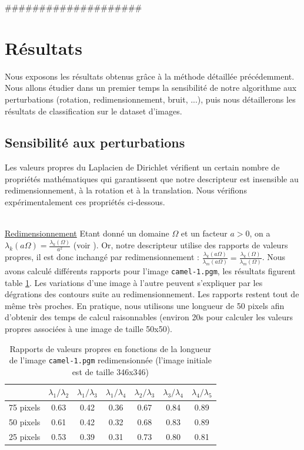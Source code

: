 \documentclass[a4paper,10pt]{article} %
\theoremstyle{definition} %
\begin{document}
####################%

\section{Résultats}

Nous exposons les résultats obtenus grâce à la méthode détaillée précédemment. Nous allons étudier dans un premier temps la sensibilité de notre algorithme aux perturbations (rotation, redimensionnement, bruit, ...), puis nous détaillerons les résultats de classification sur le dataset d'images.


  \subsection{Sensibilité aux perturbations}

Les valeurs propres du Laplacien de Dirichlet vérifient un certain nombre de propriétés mathématiques qui garantissent que notre descripteur est insensible au redimensionnement, à la rotation et à la translation. Nous vérifions expérimentalement ces propriétés ci-dessous.

~\\
\underline{Redimensionnement} Etant donné un domaine $\Omega$ et un facteur $a > 0$, on a $\lambda_k(a \Omega) = \frac{\lambda_k(\Omega)}{a^2}$ (voir \cite{KhabouHR07}). Or, notre descripteur utilise des rapports de valeurs propres, il est donc inchangé par redimensionnement : $\frac{\lambda_k(a \Omega)}{\lambda_m(a \Omega)} = \frac{\lambda_k(\Omega)}{\lambda_m(\Omega)}$. Nous avons calculé différents rapports pour l'image \texttt{camel-1.pgm}, les résultats figurent table \ref{scale}. Les variations d'une image à l'autre peuvent s'expliquer par les dégrations des contours suite au redimensionnement. Les rapports restent tout de même très proches. En pratique, nous utilisons une longueur de 50 pixels afin d'obtenir des temps de calcul raisonnables (environ 20s pour calculer les valeurs propres associées à une image de taille 50x50).

\begin{table}[H]
  \begin{center}
    \begin{tabular}{l | c c c c c c}
                & $\lambda_1 / \lambda_2$ & $\lambda_1 / \lambda_3$ & $\lambda_1 / \lambda_4$ & $\lambda_2 / \lambda_3$ & $\lambda_3 / \lambda_4$ & $\lambda_4 / \lambda_5$ \\ \hline
      75 pixels & 0.63 & 0.42 & 0.36 & 0.67 & 0.84 & 0.89 \\
      50 pixels & 0.61 & 0.42 & 0.32 & 0.68 & 0.83 & 0.89 \\
      25 pixels & 0.53 & 0.39 & 0.31 & 0.73 & 0.80 & 0.81
    \end{tabular}
  \end{center}
\caption{Rapports de valeurs propres en fonctions de la longueur de l'image \texttt{camel-1.pgm} redimensionnée (l'image initiale est de taille 346x346)}
\label{scale}
\end{table}
\end{document}
